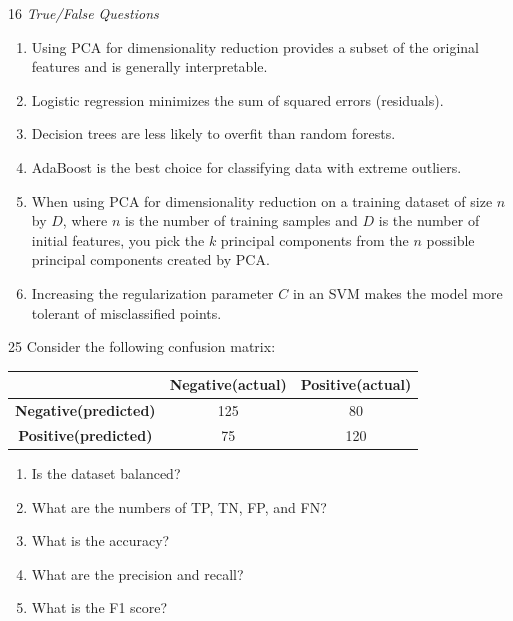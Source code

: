 \documentclass[11pt]{article}
\begin{document}
\begin{problem}{1}{6}
\textit{True/False Questions}
\begin{enumerate}[label=(\alph*)]
    \item Using PCA for dimensionality reduction provides a subset of the original features and is generally interpretable. 
    \item Logistic regression minimizes the sum of squared errors (residuals).
    \item Decision trees are less likely to overfit than random forests.
    \item AdaBoost is the best choice for classifying data with extreme outliers.
    \item When using PCA for dimensionality reduction on a training dataset of size $n$ by $D$, where $n$ is the number of training samples and $D$ is the number of initial features, you pick the $k$ principal components from the $n$ possible principal components created by PCA. 
    \item Increasing the regularization parameter $C $ in an SVM makes the model more tolerant of misclassified points.
\end{enumerate}
\end{problem}

\begin{studentanswer}[12]
\end{studentanswer}



\begin{problem}{2}{5}
Consider the following confusion matrix:

\begin{center}
\begin{tabular}{c|c|c|}
 & \textbf{Negative(actual)} & \textbf{Positive(actual)} \\
\hline
\textbf{Negative(predicted)} & 125 & 80 \\
\hline
\textbf{Positive(predicted)} & 75 & 120 \\
\hline
\end{tabular}
\end{center}

\begin{enumerate}[label=(\alph*)]
    \item Is the dataset balanced?
    \item What are the numbers of TP, TN, FP, and FN?
    \item What is the accuracy?
    \item What are the precision and recall?
    \item What is the F1 score?
\end{enumerate}
\end{problem}
\end{document}
